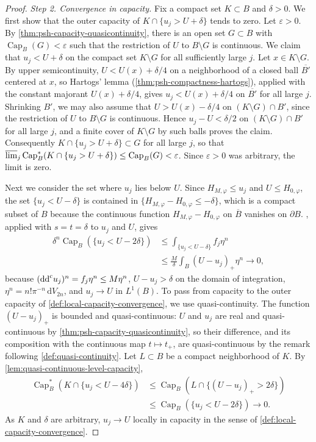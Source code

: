 \begin{proof}
\emph{Step 2. Convergence in capacity.}
Fix a compact set $K\subset B$ and $\delta>0$. We first show that the outer capacity of $K\cap\{u_j>U+\delta\}$ tends to zero. Let $\varepsilon>0$. By \cref{thm:psh-capacity-quasicontinuity}, there is an open set $G\subset B$ with $\operatorname{Cap}_B(G)<\varepsilon$ such that the restriction of $U$ to $B\setminus G$ is continuous. We claim that $u_j<U+\delta$ on the compact set $K\setminus G$ for all sufficiently large $j$. Let $x\in K\setminus G$. By upper semicontinuity, $U<U(x)+\delta/4$ on a neighborhood of a closed ball $\overline{B'}$ centered at $x$, so Hartogs' lemma (\cref{thm:psh-compactness-hartogs}), applied with the constant majorant $U(x)+\delta/4$, gives $u_j<U(x)+\delta/4$ on $\overline{B'}$ for all large $j$. Shrinking $B'$, we may also assume that $U>U(x)-\delta/4$ on $(K\setminus G)\cap B'$, since the restriction of $U$ to $B\setminus G$ is continuous. Hence $u_j-U<\delta/2$ on $(K\setminus G)\cap B'$ for all large $j$, and a finite cover of $K\setminus G$ by such balls proves the claim. Consequently $K\cap\{u_j>U+\delta\}\subset G$ for all large $j$, so that $\varlimsup_j\operatorname{Cap}_B^*(K\cap\{u_j>U+\delta\})\le\operatorname{Cap}_B(G)<\varepsilon$. Since $\varepsilon>0$ was arbitrary, the limit is zero.

Next we consider the set where $u_j$ lies below $U$. Since $H_{M,\varphi}\le u_j$ and $U\le H_{0,\varphi}$, the set $\{u_j<U-\delta\}$ is contained in $\{H_{M,\varphi}-H_{0,\varphi}\le-\delta\}$, which is a compact subset of $B$ because the continuous function $H_{M,\varphi}-H_{0,\varphi}$ on $\overline B$ vanishes on $\partial B$. , applied with $s=t=\delta$ to $u_j$ and $U$, gives
\[
 \begin{split}
 \delta^n\operatorname{Cap}_B(\{u_j<U-2\delta\})
 &\le\int_{\{u_j<U-\delta\}}f_j\eta^n\\
 &\le \frac M\delta\int_B(U-u_j)_+\eta^n\longrightarrow0,
 \end{split}
\]
because $(\mathrm{dd}^{\mathrm{c}} u_j)^n=f_j\eta^n\le M\eta^n$, $U-u_j>\delta$ on the domain of integration, $\eta^n=n!\pi^{-n}\,\mathrm dV_{2n}$, and $u_j\to U$ in $L^1(B)$. To pass from capacity to the outer capacity of \cref{def:local-capacity-convergence}, we use quasi-continuity. The function $(U-u_j)_+$ is bounded and quasi-continuous: $U$ and $u_j$ are real and quasi-continuous by \cref{thm:psh-capacity-quasicontinuity}, so their difference, and its composition with the continuous map $t\mapsto t_+$, are quasi-continuous by the remark following \cref{def:quasi-continuity}. Let $L\subset B$ be a compact neighborhood of $K$. By \cref{lem:quasi-continuous-level-capacity},
\[
 \begin{aligned}
 \operatorname{Cap}_B^*(K\cap\{u_j<U-4\delta\})
 &\le\operatorname{Cap}_B(L\cap\{(U-u_j)_+>2\delta\})\\
 &\le\operatorname{Cap}_B(\{u_j<U-2\delta\})\longrightarrow0.
 \end{aligned}
\]
As $K$ and $\delta$ are arbitrary, $u_j\to U$ locally in capacity in the sense of \cref{def:local-capacity-convergence}.


\end{proof}
